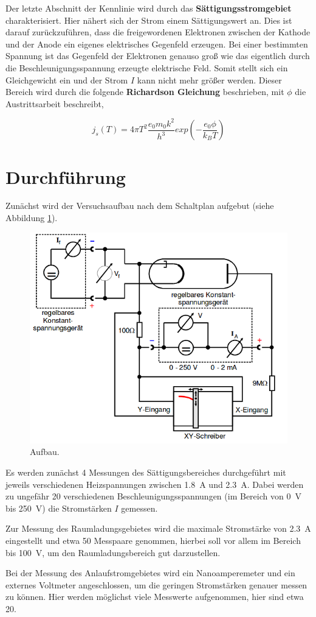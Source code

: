 Der letzte Abschnitt der Kennlinie wird durch das \textbf{Sättigungsstromgebiet} charakterisiert. Hier nähert sich der Strom einem
Sättigungswert an. Dies ist darauf zurückzuführen, dass die freigewordenen Elektronen zwischen der Kathode und der Anode ein
eigenes elektrisches Gegenfeld erzeugen. Bei einer bestimmten Spannung ist das Gegenfeld der Elektronen genauso groß wie das
eigentlich durch die Beschleunigungsspannung erzeugte elektrische Feld. Somit stellt sich ein Gleichgewicht ein und der Strom $I$
kann nicht mehr größer werden. Dieser Bereich wird durch die folgende \textbf{Richardson Gleichung} beschrieben, mit $\phi$ die Austrittsarbeit beschreibt,

\begin{equation}
  j_s(T) = 4 \pi T^2 \frac{e_0 m_0 k^2}{h^3} exp \left(- \frac{e_0 \phi}{k_B T} \right)
\end{equation}

\section{Durchführung}
Zunächst wird der Versuchsaufbau nach dem Schaltplan aufgebut (siehe Abbildung \ref{abb:3}).

\begin{figure}
  \centering
  \includegraphics[scale = 0.5]{Aufbau.png}
  \caption{Aufbau. \cite{Q1}}
  \label{abb:3}
\end{figure}

Es werden zunächst 4 Messungen des Sättigungsbereiches durchgeführt mit jeweils verschiedenen Heizspannungen zwischen \SI{1,8}{\ampere} und
\SI{2,3}{\ampere}. Dabei werden zu ungefähr 20 verschiedenen Beschleunigungsspannungen (im Bereich von \SI{0}{\volt} bis \SI{250}{\volt}) die Stromstärken $I$ gemessen.

Zur Messung des Raumladungsgebietes wird die maximale Stromstärke von \SI{2,3}{\ampere} eingestellt und etwa 50 Messpaare genommen, hierbei
soll vor allem im Bereich bis \SI{100}{\volt}, um den Raumladungsbereich gut darzustellen.

Bei der Messung des Anlaufstromgebietes wird ein Nanoamperemeter und ein externes Voltmeter angeschlossen, um die geringen Stromstärken
genauer messen zu können. Hier werden möglichst viele Messwerte aufgenommen, hier sind etwa 20.
